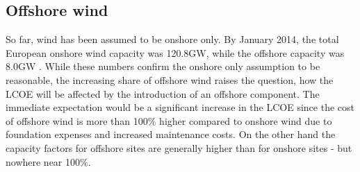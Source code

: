 \documentclass[a4paper, 5p, sort&compress]{elsarticle}%
\begin{document}



\subsection{Offshore wind}
\label{sec:offshore-wind}

So far, wind has been assumed to be onshore only. By January 2014, the
total European onshore wind capacity was 120.8GW, while the offshore
capacity was 8.0GW \cite{EWEA}. While these numbers confirm the onshore
only assumption to be reasonable, the increasing share of offshore
wind raises the question, how the LCOE will be affected by the
introduction of an offshore component. The immediate expectation would
be a significant increase in the LCOE since the cost of offshore wind
is more than 100\% higher compared to onshore wind due to foundation
expenses and increased maintenance costs. On the other hand the
capacity factors for offshore sites are generally higher than for
onshore sites - but nowhere near 100\%.
\end{document}
